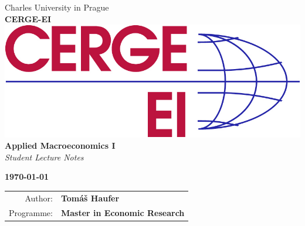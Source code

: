 \begin{titlepage}
\thispagestyle{empty} %
\setlength{\parindent}{0pt} 
\begin{center}
\vfill
    \Large Charles University in Prague
       \\[0.25cm]
     \Large\textbf{CERGE-EI}
 \\[2.8cm]
    \includegraphics[decodearray={0 1},width=0.75\linewidth]{CERGE_EI_logo_RGB.jpg}
 \\[3.2cm]

 \huge \textbf{Applied Macroeconomics I}
 \\[0.25cm] 
 \Large\textit{Student Lecture Notes}

\vfill

\vspace{16mm}

{\bf\Large \today}

\vspace{15mm}



\vfill

\large
\begin{tabular}{rl}
Author: & \bf Tomáš Haufer\\
\noalign{\vspace{2mm}}
Programme: & \bf Master in Economic Research \\
\end{tabular}

\end{center}






















\end{titlepage}